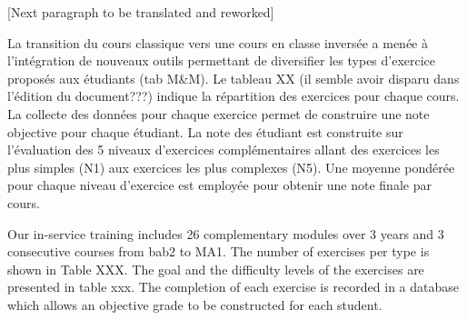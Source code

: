 \documentclass[
]{article}
\begin{document}
{[}Next paragraph to be translated and reworked{]}

La transition du cours classique vers une cours en classe inversée a
menée à l'intégration de nouveaux outils permettant de diversifier les
types d'exercice proposés aux étudiants (tab M\&M). Le tableau XX (il
semble avoir disparu dans l'édition du document???) indique la
répartition des exercices pour chaque cours. La collecte des données
pour chaque exercice permet de construire une note objective pour chaque
étudiant. La note des étudiant est construite sur l'évaluation des 5
niveaux d'exercices complémentaires allant des exercices les plus
simples (N1) aux exercices les plus complexes (N5). Une moyenne pondérée
pour chaque niveau d'exercice est employée pour obtenir une note finale
par cours.

Our in-service training includes 26 complementary modules over 3 years
and 3 consecutive courses from bab2 to MA1. The number of exercises per
type is shown in Table XXX. The goal and the difficulty levels of the
exercises are presented in table xxx. The completion of each exercise is
recorded in a database which allows an objective grade to be constructed
for each student.
\end{document}
